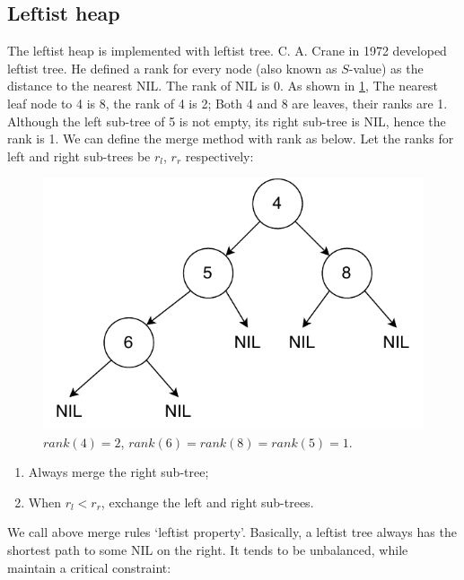 \documentclass[b5paper]{article}
\begin{document}
\subsection{Leftist heap}
  

The leftist heap is implemented with leftist tree. C. A. Crane in 1972\cite{wiki-leftist-tree} developed leftist tree. He defined a rank for every node (also known as $S$-value) as the distance to the nearest NIL. The rank of NIL is 0. As shown in \ref{fig:rank}, The nearest leaf node to 4 is 8, the rank of 4 is 2; Both 4 and 8 are leaves, their ranks are 1. Although the left sub-tree of 5 is not empty, its right sub-tree is NIL, hence the rank is 1. We can define the merge method with rank as below. Let the ranks for left and right sub-trees be $r_l$, $r_r$ respectively:

\begin{figure}[htbp]
  \centering
  \includegraphics[scale=0.5]{img/rank}
  \caption{$rank(4) = 2$, $rank(6) = rank(8) = rank(5) = 1$.}
  \label{fig:rank}
\end{figure}

\begin{enumerate}
\item Always merge the right sub-tree;
\item When $r_l < r_r$, exchange the left and right sub-trees.
\end{enumerate}

We call above merge rules `leftist property'. Basically, a leftist tree always has the shortest path to some NIL on the right. It tends to be unbalanced, while maintain a critical constraint:
\end{document}
